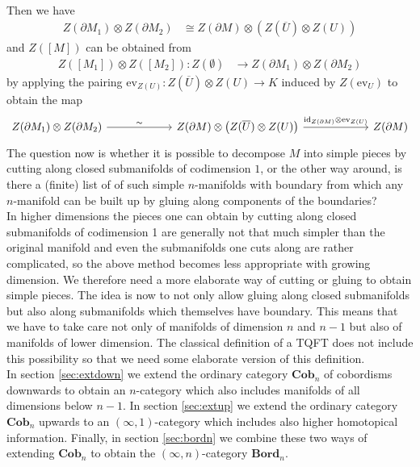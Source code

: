 \\
Then we have
\begin{align*}
  Z(\partial M_{1})
  \otimes
  Z(\partial M_{2})
  &\cong
  Z(\partial M)
  \otimes
  \left(
    Z(\overline{U})
    \otimes
    Z(U)
  \right)
\end{align*}
and $Z([M])$ can be obtained from
\begin{align*}
  Z([M_{1}])
  \otimes
  Z([M_{2}])
  \colon
  Z(\emptyset)
  &\to
  Z(\partial M_{1})
  \otimes
  Z(\partial M_{2})
\end{align*}
by applying the pairing $\mathrm{ev}_{Z(U)} \colon Z(\overline{U}) \otimes Z(U) \to K$ induced by $Z(\mathrm{ev}_{U})$ to obtain the map
\begin{equation*}
\begin{tikzcd}[row sep=2.4em,column sep=6em]
  Z(\partial M_{1})
  \otimes
  Z(\partial M_{2})
  \ar{r}{\sim}
  &
  Z(\partial M)
  \otimes
  \left(
    Z(\overline{U})
    \otimes
    Z(U)
  \right)
  \ar{r}{\mathrm{id}_{Z(\partial M)} \otimes \mathrm{ev}_{Z(U)}}
  &
  Z(\partial M)
\end{tikzcd}
\end{equation*}
The question now is whether it is possible to decompose $M$ into {\glqq}simple{\grqq} pieces by cutting along closed submanifolds of codimension $1$, or the other way around, is there a (finite) list of of such {\glqq}simple{\grqq} $n$-manifolds with boundary from which any $n$-manifold can be built up by gluing along  components of the boundaries?
\\
In higher dimensions the pieces one can obtain by cutting along closed submanifolds of codimension 1 are generally not that much simpler than the original manifold and even the submanifolds one cuts along are rather complicated, so the above method becomes less appropriate with growing dimension. We therefore need a more elaborate way of cutting or gluing to obtain simple pieces. The idea is now to not only allow gluing along closed submanifolds but also along submanifolds which themselves have boundary. This means that we have to take care not only of manifolds of dimension $n$ and $n-1$ but also of manifolds of lower dimension. The classical definition of a TQFT does not include this possibility so that we need some elaborate version of this definition.
\\
In section \ref{sec:extdown} we extend the ordinary category $\mathbf{Cob}_{n}$ of cobordisms downwards to obtain an $n$-category which also includes manifolds of all dimensions below $n-1$. In section \ref{sec:extup} we extend the ordinary category $\mathbf{Cob}_{n}$ upwards to an $(\infty,1)$-category which includes also higher homotopical information. Finally, in section \ref{sec:bordn} we combine these two ways of extending $\mathbf{Cob}_{n}$ to obtain the $(\infty,n)$-category $\mathbf{Bord}_{n}$.
